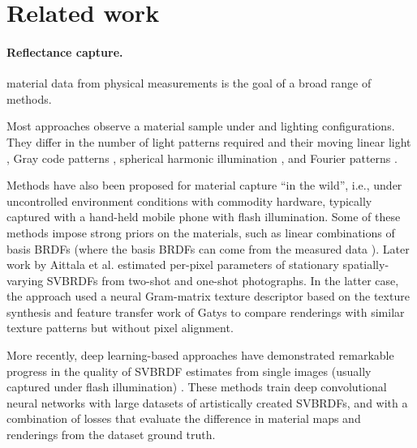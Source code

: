 \section{Related work}
\label{sec:related}

\paragraph{Reflectance capture.}
 material data from physical measurements is the goal of a broad range of methods.

Most  approaches %
observe a material sample under  and lighting configurations. They differ in the number of light patterns required and their  moving linear light \cite{Gardner2003,Ren2011}, Gray code patterns \cite{Francken2009}, spherical harmonic illumination \cite{Ghosh2009}, and Fourier patterns \cite{Aittala2013}.

Methods have also been proposed for material capture ``in the wild'', i.e., under uncontrolled environment conditions with commodity hardware, typically captured with a hand-held mobile phone with flash illumination. Some of these methods impose strong priors on the materials, such as linear combinations of basis BRDFs \cite{Hui2017,Xu2016} (where the basis BRDFs can come from the measured data \cite{Matusik2003}). Later work by Aittala et al.  estimated per-pixel parameters of stationary spatially-varying SVBRDFs from two-shot and one-shot photographs.
In the latter case, the approach used a neural Gram-matrix texture descriptor based on the texture synthesis and feature transfer work of Gatys  to compare renderings with similar texture patterns but without pixel alignment.

More recently, deep learning-based approaches have demonstrated remarkable progress in the quality of SVBRDF estimates from single images (usually captured under flash illumination) \cite{Li2017,Deschaintre2018,Li2018}. These methods train deep convolutional neural networks with large datasets of artistically created SVBRDFs, and with a combination of losses that evaluate the difference in material maps and renderings from the dataset ground truth.

